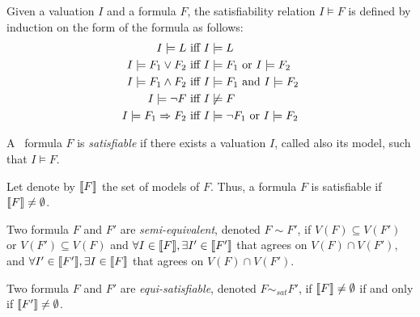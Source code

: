 Given a valuation $I$ and a formula $F$, the satisfiability relation $I \models F$ is defined by induction on the form of the formula as follows:
\begin{align*}
I \models L \mbox{ iff }& I \models L \\
I \models F_1\lor F_2 \mbox{ iff } & I \models F_1 \mbox{ or } I\models F_2 \\
I \models F_1\land F_2 \mbox{ iff } & I \models F_1 \mbox{ and } I\models F_2 \\
I \models \lnot F \mbox{ iff } & I \not\models F \\
I \models F_1\Rightarrow F_2 \mbox{ iff } & I \models \lnot F_1 \mbox{ or } I\models F_2
\end{align*}

\begin{mydef}
  A \QFBILIA\ formula $F$ is \emph{satisfiable} if there exists a valuation $I$, called also its model, such that $I \models F$.
\end{mydef}

Let denote by $\llbracket F \rrbracket$ the set of models of $F$. Thus, a formula $F$ is satisfiable if $\llbracket F \rrbracket\neq\emptyset$.

\begin{mydef}
  Two formula $F$ and $F'$ are \emph{semi-equivalent}, denoted $F \sim F'$,
  if $V(F)\subseteq V(F')$ or $V(F')\subseteq V(F)$ and $\forall I \in \llbracket F \rrbracket,\exists I'\in \llbracket F' \rrbracket$ that agrees on $V(F)\cap V(F')$, and $\forall I' \in \llbracket F' \rrbracket,\exists I\in \llbracket F \rrbracket$ that agrees on $V(F)\cap V(F')$.
\end{mydef}

\begin{mydef}
  Two formula $F$ and $F'$ are \emph{equi-satisfiable}, denoted $F \sim_{\mathit{sat}} F'$,
  if $\llbracket F \rrbracket\neq\emptyset$ if and only if $\llbracket F' \rrbracket\neq\emptyset$.
\end{mydef}



